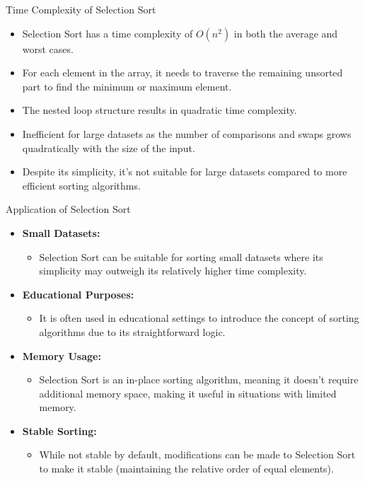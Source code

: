 \documentclass{beamer}
\begin{document}
\begin{frame}{Time Complexity of Selection Sort}
  \begin{itemize}
    \item Selection Sort has a time complexity of $O(n^2)$ in both the average and worst cases.
    \item For each element in the array, it needs to traverse the remaining unsorted part to find the minimum or maximum element.
    \item The nested loop structure results in quadratic time complexity.
    \item Inefficient for large datasets as the number of comparisons and swaps grows quadratically with the size of the input.
    \item Despite its simplicity, it's not suitable for large datasets compared to more efficient sorting algorithms.
  \end{itemize}
\end{frame}

\begin{frame}{Application of Selection Sort}
  \begin{itemize}
    \item \textbf{\color{blue}Small Datasets:}
          \begin{itemize}
            \item Selection Sort can be suitable for sorting small datasets where its simplicity may outweigh its relatively higher time complexity.
          \end{itemize}
    \item \textbf{\color{blue}Educational Purposes:}
          \begin{itemize}
            \item It is often used in educational settings to introduce the concept of sorting algorithms due to its straightforward logic.
          \end{itemize}
    \item \textbf{\color{blue}Memory Usage:}
          \begin{itemize}
            \item Selection Sort is an in-place sorting algorithm, meaning it doesn't require additional memory space, making it useful in situations with limited memory.
          \end{itemize}
    \item \textbf{\color{blue}Stable Sorting:}
          \begin{itemize}
            \item While not stable by default, modifications can be made to Selection Sort to make it stable (maintaining the relative order of equal elements).
          \end{itemize}
  \end{itemize}
\end{frame}
\end{document}
